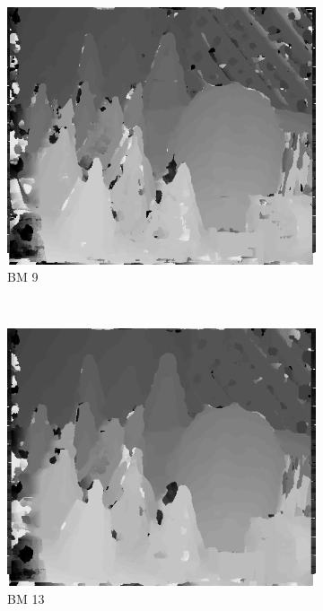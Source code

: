 \begin{figure}
  \begin{subfigure}[b]{0.23\textwidth}
    \centering
    \includegraphics[width=\textwidth]{images/stereo-pairs/cones_bm_9.png}
    \caption{BM 9}
  \end{subfigure}
  ~
  \begin{subfigure}[b]{0.23\textwidth}
    \centering
    \includegraphics[width=\textwidth]{images/stereo-pairs/cones_bm_13.png}
    \caption{BM 13}
  \end{subfigure}
  ~
  \begin{subfigure}[b]{0.23\textwidth}

\end{subfigure}
\end{figure}
